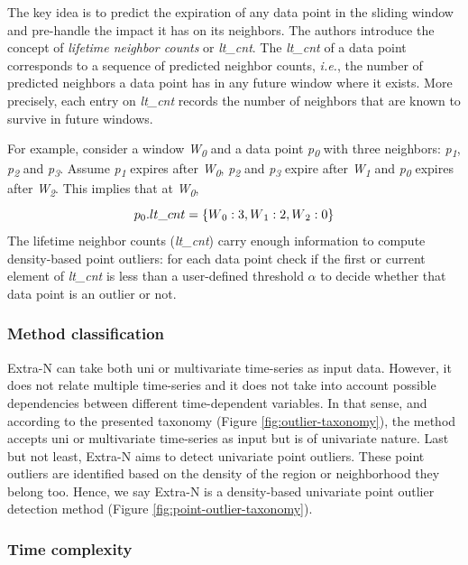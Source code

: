The key idea is to predict the expiration of any data point in the sliding window and pre-handle the impact it has on its neighbors. The authors introduce the concept of \emph{lifetime neighbor counts} or \textit{lt\_cnt}. The \textit{lt\_cnt} of a data point corresponds to a sequence of predicted neighbor counts, \textit{i.e.}, the number of predicted neighbors a data point has in any future window where it exists. More precisely, each entry on \textit{lt\_cnt} records the number of neighbors that are known to survive in future windows. 

For example, consider a window \textit{W\textsubscript{0}} and a data point \textit{p\textsubscript{0}} with three neighbors: \textit{p\textsubscript{1}}, \textit{p\textsubscript{2}} and \textit{p\textsubscript{3}}. Assume \textit{p\textsubscript{1}} expires after \textit{W\textsubscript{0}}, \textit{p\textsubscript{2}} and \textit{p\textsubscript{3}} expire after \textit{W\textsubscript{1}} and \textit{p\textsubscript{0}} expires after \textit{W\textsubscript{2}}. This implies that at \textit{W\textsubscript{0}}, 
\[ p\textsubscript{0}.lt\_cnt = \{W\textsubscript{0}: 3, W\textsubscript{1}: 2, W\textsubscript{2}: 0\} \]
The lifetime neighbor counts (\textit{lt\_cnt}) carry enough information to compute density-based point outliers: for each data point check if the first or current element of \textit{lt\_cnt} is less than a user-defined threshold $\alpha$ to decide whether that data point is an outlier or not.


\subsubsection*{Method classification}
Extra-N can take both uni or multivariate time-series as input data. However, it does not relate multiple time-series and it does not take into account possible dependencies between different time-dependent variables. In that sense, and according to the presented taxonomy (Figure \ref{fig:outlier-taxonomy}), the method accepts uni or multivariate time-series as input but is of univariate nature. Last but not least, Extra-N aims to detect univariate point outliers. These point outliers are identified based on the density of the region or neighborhood they belong too. Hence, we say Extra-N is a density-based univariate point outlier detection method (Figure \ref{fig:point-outlier-taxonomy}).

\subsubsection*{Time complexity}

